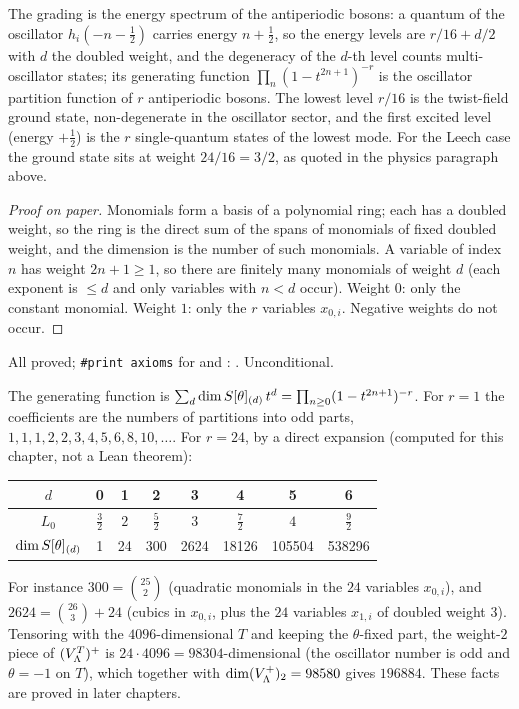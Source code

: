 \begin{physics}
The grading is the energy spectrum of the antiperiodic bosons: a quantum of the oscillator $h_i(-n-\tfrac12)$ carries energy $n+\tfrac12$, so the energy levels are $r/16+d/2$ with $d$ the doubled weight, and the degeneracy of the $d$-th level counts multi-oscillator states; its generating function $\prod_n(1-t^{2n+1})^{-r}$ is the oscillator partition function of $r$ antiperiodic bosons. The lowest level $r/16$ is the twist-field ground state, non-degenerate in the oscillator sector, and the first excited level (energy $+\tfrac12$) is the $r$ single-quantum states of the lowest mode. For the Leech case the ground state sits at weight $24/16=3/2$, as quoted in the physics paragraph above.
\end{physics}
\begin{proof}[Proof on paper]
Monomials form a basis of a polynomial ring; each has a doubled weight, so the ring is the direct
sum of the spans of monomials of fixed doubled weight, and the dimension is the number of such
monomials.  A variable of index $n$ has weight $2n+1\ge1$, so there are finitely many monomials of
weight $d$ (each exponent is $\le d$ and only variables with $n<d$ occur).  Weight $0$: only the
constant monomial.  Weight $1$: only the $r$ variables $x_{0,i}$.  Negative weights do not occur.
\end{proof}
\begin{status}
All proved; \texttt{\#print axioms} for  and :
.  Unconditional.
\end{status}

\begin{example}\label{ch06:ex:dims}
The generating function is $\sum_d\dim S[\theta]_{(d)}\,t^d=\prod_{n\ge0}(1-t^{2n+1})^{-r}$.  For
$r=1$ the coefficients are the numbers of partitions into odd parts,
$1,1,1,2,2,3,4,5,6,8,10,\dots$.  For $r=24$, by a direct expansion (computed for this chapter, not a
Lean theorem):
\begin{center}
\begin{tabular}{c|ccccccc}
$d$ & 0&1&2&3&4&5&6\\\hline
$L_0$ & $\frac32$&$2$&$\frac52$&$3$&$\frac72$&$4$&$\frac92$\\
$\dim S[\theta]_{(d)}$ & 1&24&300&2624&18126&105504&538296
\end{tabular}
\end{center}
For instance $300=\binom{25}{2}$ (quadratic monomials in the $24$ variables $x_{0,i}$), and
$2624=\binom{26}3+24$ (cubics in $x_{0,i}$, plus the $24$ variables $x_{1,i}$ of doubled weight
$3$).  Tensoring with the $4096$-dimensional $T$ and keeping the $\theta$-fixed part, the weight-$2$
piece of $(V_{\Lambda}^T)^+$ is $24\cdot 4096=98304$-dimensional (the oscillator number is odd and
$\theta=-1$ on $T$), which together with $\dim(V_{\Lambda}^+)_2=98580$ gives $196884$.  These facts
are proved in later chapters.
\end{example}

